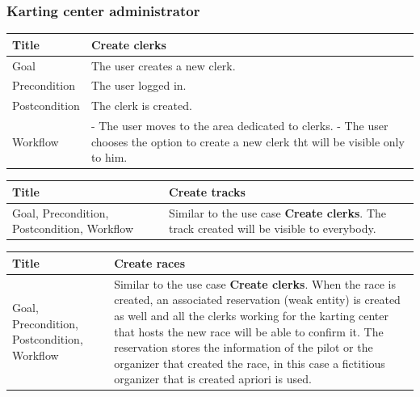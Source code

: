 \documentclass{beamer}
\begin{document}
\begin{frame}
    \frametitle{Karting center administrator}
    \begin{table}
        \tiny
        \begin{tabular}{|p{2cm}|p{6cm}|}
        \hline  
        Title & \textbf{Create clerks} \\
        \hline
        Goal & The user creates a new clerk. \\
        \hline
        Precondition & The user logged in. \\
        \hline
        Postcondition & The clerk is created. \\
        \hline
        Workflow &
        - The user moves to the area dedicated to clerks. \newline
        - The user chooses the option to create a new clerk tht will be visible only to him. \\
        \hline
        \end{tabular}
\end{table}

\begin{table}
    \tiny
    \begin{tabular}{|p{2cm}|p{6cm}|}
    \hline  
    Title & \textbf{Create tracks} \\
    \hline
    Goal, Precondition, Postcondition, Workflow & Similar to the use case \textbf{Create clerks}.
    The track created will be visible to everybody. \\
    \hline
    \end{tabular}
\end{table}

\begin{table}
    \tiny
    \begin{tabular}{|p{2cm}|p{6cm}|}
    \hline  
    Title & \textbf{Create races} \\
    \hline
    Goal, Precondition, Postcondition, Workflow & Similar to the use case \textbf{Create clerks}. 
    When the race is created, an associated reservation (weak entity) is created as well and all the clerks
    working for the karting center that hosts the new race will be able to confirm it.
    The reservation stores the information of the pilot or the organizer that created the race, 
    in this case a fictitious organizer that is created apriori is used.\\
    \hline
    \end{tabular}
\end{table}

\end{frame}
\end{document}
